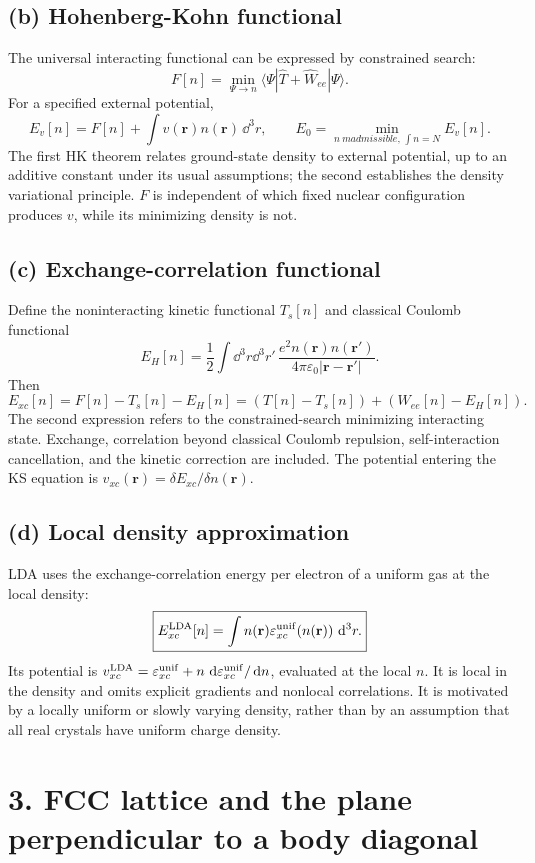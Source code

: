 \subsection*{(b) Hohenberg-Kohn functional}
The universal interacting functional can be expressed by constrained search:
\[
F[n]=\min_{\Psi\to n}\langle\Psi|\hat T+\hat W_{ee}|\Psi\rangle.
\]
For a specified external potential,
\[
E_v[n]=F[n]+\int v(\mathbf r)n(\mathbf r)\,\dd^3r,
\qquad E_0=\min_{n\ {
m admissible},\,\int n=N}E_v[n].
\]
The first HK theorem relates ground-state density to external potential, up to an additive constant under its usual assumptions; the second establishes the density variational principle. $F$ is independent of which fixed nuclear configuration produces $v$, while its minimizing density is not.

\subsection*{(c) Exchange-correlation functional}
Define the noninteracting kinetic functional $T_s[n]$ and classical Coulomb functional
\[
E_H[n]=\frac12\int\dd^3r\dd^3r'\,
\frac{e^2n(\mathbf r)n(\mathbf r')}{4\pi\varepsilon_0|\mathbf r-\mathbf r'|}.
\]
Then
\[
\boxed{E_{xc}[n]=F[n]-T_s[n]-E_H[n]
=(T[n]-T_s[n])+(W_{ee}[n]-E_H[n]).}
\]
The second expression refers to the constrained-search minimizing interacting state. Exchange, correlation beyond classical Coulomb repulsion, self-interaction cancellation, and the kinetic correction are included. The potential entering the KS equation is $v_{xc}(\mathbf r)=\delta E_{xc}/\delta n(\mathbf r)$.

\subsection*{(d) Local density approximation}
LDA uses the exchange-correlation energy per electron of a uniform gas at the local density:
\[
\boxed{E_{xc}^{\rm LDA}[n]=\int n(\mathbf r)
\varepsilon_{xc}^{\rm unif}(n(\mathbf r))\,\mathop{}\!\mathrm{d}^3r.}
\]
Its potential is $v_{xc}^{\rm LDA}=\varepsilon_{xc}^{\rm unif}+n\,\mathop{}\!\mathrm{d}\varepsilon_{xc}^{\rm unif}/\mathop{}\!\mathrm{d} n$, evaluated at the local $n$. It is local in the density and omits explicit gradients and nonlocal correlations. It is motivated by a locally uniform or slowly varying density, rather than by an assumption that all real crystals have uniform charge density.

\section*{3. FCC lattice and the plane perpendicular to a body diagonal}
